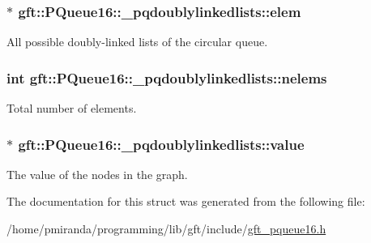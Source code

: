 \subsubsection[{\texorpdfstring{elem}{elem}}]{$\ast$ gft\+::\+P\+Queue16\+::\+\_\+pqdoublylinkedlists\+::elem}\hypertarget{structgft_1_1PQueue16_1_1__pqdoublylinkedlists_a7ea91d6d755456e562d4ac1cd481cafe}{}\label{structgft_1_1PQueue16_1_1__pqdoublylinkedlists_a7ea91d6d755456e562d4ac1cd481cafe}


All possible doubly-\/linked lists of the circular queue. 

\subsubsection[{\texorpdfstring{nelems}{nelems}}]{\setlength{\rightskip}{0pt plus 5cm}int gft\+::\+P\+Queue16\+::\+\_\+pqdoublylinkedlists\+::nelems}\hypertarget{structgft_1_1PQueue16_1_1__pqdoublylinkedlists_ae51ba2f93a5a4ac83e9c3f2baf63bdc7}{}\label{structgft_1_1PQueue16_1_1__pqdoublylinkedlists_ae51ba2f93a5a4ac83e9c3f2baf63bdc7}


Total number of elements. 

\subsubsection[{\texorpdfstring{value}{value}}]{$\ast$ gft\+::\+P\+Queue16\+::\+\_\+pqdoublylinkedlists\+::value}\hypertarget{structgft_1_1PQueue16_1_1__pqdoublylinkedlists_acac5733fab27f2e9c9c9b42ecf373d1e}{}\label{structgft_1_1PQueue16_1_1__pqdoublylinkedlists_acac5733fab27f2e9c9c9b42ecf373d1e}


The value of the nodes in the graph. 



The documentation for this struct was generated from the following file\+:\begin{DoxyCompactItemize}
\item 
/home/pmiranda/programming/lib/gft/include/\hyperlink{gft__pqueue16_8h}{gft\+\_\+pqueue16.\+h}\end{DoxyCompactItemize}
